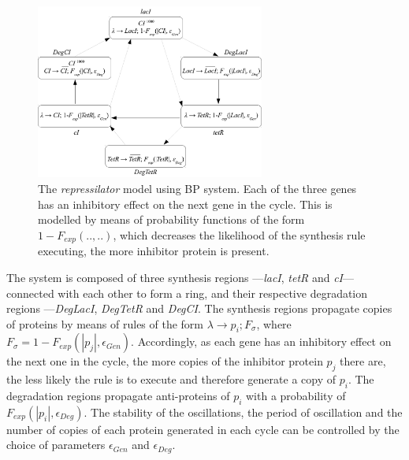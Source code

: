 \documentclass[runningheads,a4paper]{llncs}
\begin{document}
\begin{figure}
\begin{center}
\includegraphics[width=0.67\textwidth]{DiagRepress}
\caption{The \textit{repressilator} model using BP system. Each of the three genes has an inhibitory effect on the next gene in the cycle. This is modelled by means of probability functions of the form $1-F_{exp}(..,..)$, which decreases the likelihood of the synthesis rule executing, the more inhibitor protein is present.}
\label{f:DiagRepress}
\end{center}
\end{figure}

The system is composed of three synthesis regions ---\textit{lacI}, \textit{tetR} and \textit{cI}--- connected with each other to form a ring, and their respective degradation regions ---\textit{DegLacI}, \textit{DegTetR} and \textit{DegCI}. The synthesis regions propagate copies of proteins by means of rules of the form $\lambda \rightarrow p_i; F_\sigma$, where $F_\sigma=1-F_{exp}(|p_j|, \epsilon_{Gen})$. Accordingly, as each gene has an inhibitory effect on the next one in the cycle, the more copies of the inhibitor protein $ p_j$ there are, the less likely the rule is to execute and therefore generate a copy of $p_i$. The degradation regions propagate anti-proteins of $p_i$ with a probability of $F_{exp}(|p_i|, \epsilon_{Deg} )$. The stability of the oscillations, the period of oscillation and the number of copies of each protein generated in each cycle can be controlled by the choice of parameters $\epsilon_{Gen}$ and $\epsilon_{Deg}$.
\end{document}
